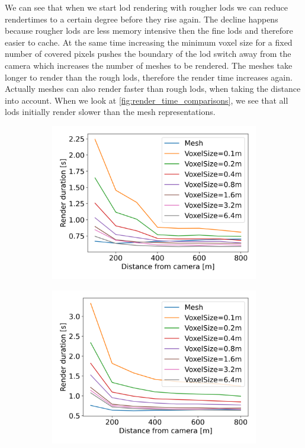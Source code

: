 We can see that when we start \ac{lod} rendering with rougher \acsp{lod} we can reduce rendertimes to a certain degree before they rise again.
The decline happens because rougher \acsp{lod} are less memory intensive then the fine \acsp{lod} and therefore easier to cache.
At the same time increasing the minimum voxel size for a fixed number of covered pixels pushes the boundary of the \ac{lod} switch away from the camera which increases the number of meshes to be rendered.
The meshes take longer to render than the rough \acsp{lod}, therefore the render time increases again.
Actually meshes can also render faster than rough \acsp{lod}, when taking the distance into account.
When we look at \ref{fig:render_time_comparisons}, we see that all \acsp{lod} initially render slower than the mesh representations.
\begin{figure}[ht]
    \centering
    \begin{subfigure}[b]{0.45\linewidth}
        \centering
        \includegraphics[width=1\linewidth]{img/results/render_durations_PR04a.png}
        \caption{}
    \end{subfigure}
    \begin{subfigure}[b]{0.45\linewidth}
        \centering
        \includegraphics[width=1\linewidth]{img/results/render_durations_EA01a.png}

\end{subfigure}
\end{figure}
